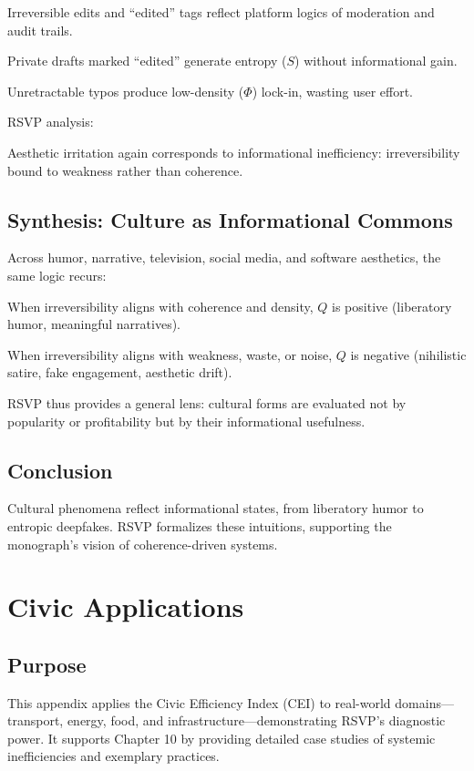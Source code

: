 \documentclass[openany]{book}
\begin{document}
Irreversible edits and ``edited'' tags reflect platform logics of moderation and audit trails.

Private drafts marked ``edited'' generate entropy (\( S \)) without informational gain.

Unretractable typos produce low-density (\( \Phi \)) lock-in, wasting user effort.

RSVP analysis:

Aesthetic irritation again corresponds to informational inefficiency: irreversibility bound to weakness rather than coherence.

\section{Synthesis: Culture as Informational Commons}

Across humor, narrative, television, social media, and software aesthetics, the same logic recurs:

When irreversibility aligns with coherence and density, \( Q \) is positive (liberatory humor, meaningful narratives).

When irreversibility aligns with weakness, waste, or noise, \( Q \) is negative (nihilistic satire, fake engagement, aesthetic drift).

RSVP thus provides a general lens: cultural forms are evaluated not by popularity or profitability but by their informational usefulness.

\section{Conclusion}

Cultural phenomena reflect informational states, from liberatory humor to entropic deepfakes. RSVP formalizes these intuitions, supporting the monograph’s vision of coherence-driven systems.

\chapter{Civic Applications}

\section{Purpose}

This appendix applies the Civic Efficiency Index (CEI) to real-world domains—transport, energy, food, and infrastructure—demonstrating RSVP’s diagnostic power. It supports Chapter 10 by providing detailed case studies of systemic inefficiencies and exemplary practices.
\end{document}
